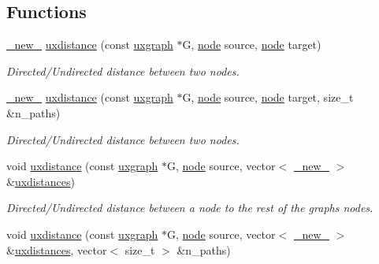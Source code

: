 \subsection*{Functions}
\begin{DoxyCompactItemize}
\item 
\hyperlink{namespacelgraph_1_1utils_a2c84bfde888c42ab3ad6b2cb8a364240}{\+\_\+new\+\_\+} \hyperlink{namespacelgraph_1_1traversal_a73bb6b5984fc97e12576ca4f16344fbf}{uxdistance} (const \hyperlink{classlgraph_1_1utils_1_1uxgraph}{uxgraph} $\ast$G, \hyperlink{namespacelgraph_1_1utils_ab9c6b34241f0b68372c55f34c460e863}{node} source, \hyperlink{namespacelgraph_1_1utils_ab9c6b34241f0b68372c55f34c460e863}{node} target)
\begin{DoxyCompactList}\small\item\em Directed/\+Undirected distance between two nodes. \end{DoxyCompactList}\item 
\hyperlink{namespacelgraph_1_1utils_a2c84bfde888c42ab3ad6b2cb8a364240}{\+\_\+new\+\_\+} \hyperlink{namespacelgraph_1_1traversal_a084aa7ff13d10613c411ff8d4a2dc4c8}{uxdistance} (const \hyperlink{classlgraph_1_1utils_1_1uxgraph}{uxgraph} $\ast$G, \hyperlink{namespacelgraph_1_1utils_ab9c6b34241f0b68372c55f34c460e863}{node} source, \hyperlink{namespacelgraph_1_1utils_ab9c6b34241f0b68372c55f34c460e863}{node} target, size\+\_\+t \&n\+\_\+paths)
\begin{DoxyCompactList}\small\item\em Directed/\+Undirected distance between two nodes. \end{DoxyCompactList}\item 
void \hyperlink{namespacelgraph_1_1traversal_aa21660a600fa553678d686341226f8e0}{uxdistance} (const \hyperlink{classlgraph_1_1utils_1_1uxgraph}{uxgraph} $\ast$G, \hyperlink{namespacelgraph_1_1utils_ab9c6b34241f0b68372c55f34c460e863}{node} source, vector$<$ \hyperlink{namespacelgraph_1_1utils_a2c84bfde888c42ab3ad6b2cb8a364240}{\+\_\+new\+\_\+} $>$ \&\hyperlink{namespacelgraph_1_1traversal_ab04202d9a05b39b38e5e8f35475b1665}{uxdistances})
\begin{DoxyCompactList}\small\item\em Directed/\+Undirected distance between a node to the rest of the graph\textquotesingle{}s nodes. \end{DoxyCompactList}\item 
void \hyperlink{namespacelgraph_1_1traversal_a8b5060314b2349de4757d1509560f9c6}{uxdistance} (const \hyperlink{classlgraph_1_1utils_1_1uxgraph}{uxgraph} $\ast$G, \hyperlink{namespacelgraph_1_1utils_ab9c6b34241f0b68372c55f34c460e863}{node} source, vector$<$ \hyperlink{namespacelgraph_1_1utils_a2c84bfde888c42ab3ad6b2cb8a364240}{\+\_\+new\+\_\+} $>$ \&\hyperlink{namespacelgraph_1_1traversal_ab04202d9a05b39b38e5e8f35475b1665}{uxdistances}, vector$<$ size\+\_\+t $>$ \&n\+\_\+paths)

\end{DoxyCompactItemize}
